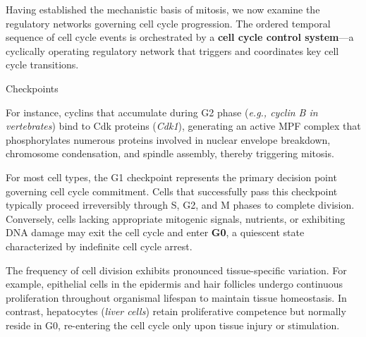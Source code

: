 \documentclass[10pt]{article}
\begin{document}
    Having established the mechanistic basis of mitosis, we now examine the regulatory networks governing cell cycle progression. The ordered temporal sequence of cell cycle events is orchestrated by a \textbf{cell cycle control system}---a cyclically operating regulatory network that triggers and coordinates key cell cycle transitions.

    \begin{core}{Checkpoints}


      For instance, cyclins that accumulate during G2 phase (\textit{e.g., cyclin B in vertebrates}) bind to Cdk proteins (\textit{Cdk1}), generating an active MPF complex that phosphorylates numerous proteins involved in nuclear envelope breakdown, chromosome condensation, and spindle assembly, thereby triggering mitosis.


      For most cell types, the G1 checkpoint represents the primary decision point governing cell cycle commitment. Cells that successfully pass this checkpoint typically proceed irreversibly through S, G2, and M phases to complete division. Conversely, cells lacking appropriate mitogenic signals, nutrients, or exhibiting DNA damage may exit the cell cycle and enter \textbf{G0}, a quiescent state characterized by indefinite cell cycle arrest.

    \end{core}

    The frequency of cell division exhibits pronounced tissue-specific variation. For example, epithelial cells in the epidermis and hair follicles undergo continuous proliferation throughout organismal lifespan to maintain tissue homeostasis. In contrast, hepatocytes (\textit{liver cells}) retain proliferative competence but normally reside in G0, re-entering the cell cycle only upon tissue injury or stimulation.
\end{document}
